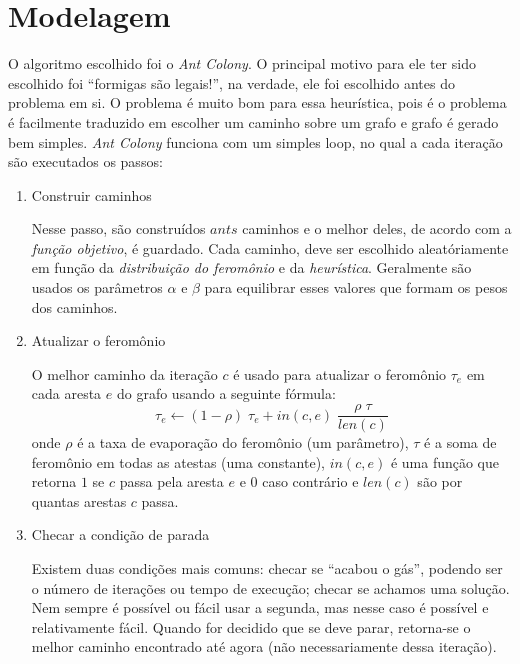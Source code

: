 \documentclass{article}
\begin{document}
\section{Modelagem}

O algoritmo escolhido foi o \emph{Ant Colony}.
O principal motivo para ele ter sido escolhido
foi ``formigas são legais!'',
na verdade, ele foi escolhido antes do problema em si.
O problema é muito bom para essa heurística,
pois é o problema é facilmente traduzido
em escolher um caminho sobre um grafo e
grafo é gerado bem simples.
\emph{Ant Colony} funciona com um simples loop,
no qual a cada iteração são executados os passos:
\begin{enumerate}
    \item Construir caminhos \par
        Nesse passo, são construídos \(ants\) caminhos e
        o melhor deles, de acordo com a \emph{função objetivo},
        é guardado.
        Cada caminho, deve ser escolhido aleatóriamente
        em função da \emph{distribuição do feromônio} e
        da \emph{heurística}.
        Geralmente são usados os parâmetros \(\alpha\) e \(\beta\)
        para equilibrar esses valores
        que formam os pesos dos caminhos.
    \item Atualizar o feromônio \par
        O melhor caminho da iteração \(c\) é usado
        para atualizar
        o feromônio \(\tau_e\) em cada aresta \(e\) do grafo
        usando a seguinte fórmula:
        \[
            \tau_e \leftarrow
                (1 - \rho) \; \tau_e
                + in(c, e) \; \frac{\rho \; \tau}{len(c)}
        \]
        onde \(\rho\) é a taxa de evaporação do feromônio
        (um parâmetro),
        \(\tau\) é a soma de feromônio em todas as atestas
        (uma constante),
        \(in(c, e)\) é uma função que retorna \(1\) se
        \(c\) passa pela aresta \(e\) e \(0\) caso contrário e
        \(len(c)\) são por quantas arestas \(c\) passa.
    \item Checar a condição de parada \par
        Existem duas condições mais comuns:
        checar se ``acabou o gás'',
        podendo ser o número de iterações ou tempo de execução;
        checar se achamos uma solução.
        Nem sempre é possível ou fácil usar a segunda,
        mas nesse caso é possível e relativamente fácil.
        Quando for decidido que se deve parar,
        retorna-se o melhor caminho encontrado até agora
        (não necessariamente dessa iteração).
\end{enumerate}
\end{document}
